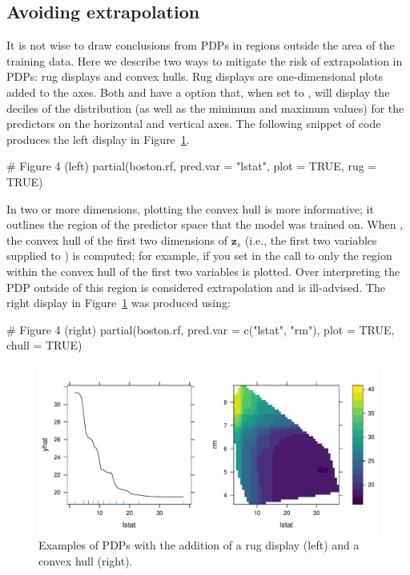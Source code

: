 \subsection{Avoiding extrapolation}

It is not wise to draw conclusions from PDPs in regions outside the area of the training data. Here we describe two ways to mitigate the risk of extrapolation in PDPs: rug displays and convex hulls. Rug displays are one-dimensional plots added to the axes. Both  and  have a  option that, when set to , will display the deciles of the distribution (as well as the minimum and maximum values) for the predictors on the horizontal and vertical axes. The following snippet of code produces the left display in Figure~\ref{fig:partial_extrap}.
\begin{example}
# Figure 4 (left)
partial(boston.rf, pred.var = "lstat", plot = TRUE, rug = TRUE)
\end{example}

In two or more dimensions, plotting the convex hull is more informative; it outlines the region of the predictor space that the model was trained on. When , the convex hull of the first two dimensions of $\boldsymbol{z}_s$ (i.e., the first two variables supplied to ) is computed; for example, if you set  in the call to  only the region within the convex hull of the first two variables is plotted. Over interpreting the PDP outside of this region is considered extrapolation and is ill-advised. The right display in Figure~\ref{fig:partial_extrap} was produced using:
\begin{example}
# Figure 4 (right)
partial(boston.rf, pred.var = c("lstat", "rm"), plot = TRUE, chull = TRUE)
\end{example}

\begin{figure}[!htbp]
  \centering
  \includegraphics[width=1.0\linewidth]{partial_extrap}
  \caption{Examples of PDPs with the addition of a rug display (left) and a convex hull (right).}
  \label{fig:partial_extrap}
\end{figure}


